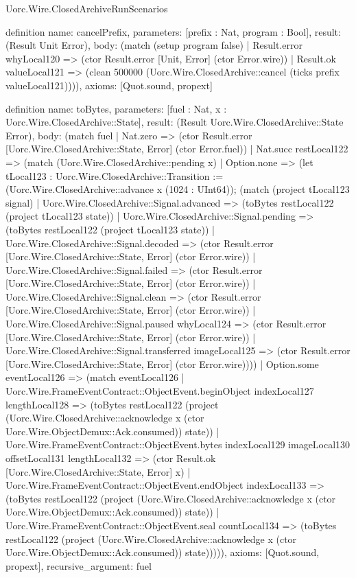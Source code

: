 \begin{lexlean}{Uorc.Wire.ClosedArchiveRunScenarios}
\begin{semanticmodule}
definition{
  name: cancelPrefix,
  parameters: [prefix : Nat, program : Bool],
  result: (Result Unit Error),
  body: (match (setup program false)
    | Result.error whyLocal120 => (ctor Result.error [Unit, Error] (ctor Error.wire))
    | Result.ok valueLocal121 => (clean 500000 (Uorc.Wire.ClosedArchive::cancel (ticks prefix valueLocal121)))),
  axioms: [Quot.sound, propext]
}

definition{
  name: toBytes,
  parameters: [fuel : Nat, x : Uorc.Wire.ClosedArchive::State],
  result: (Result Uorc.Wire.ClosedArchive::State Error),
  body: (match fuel
    | Nat.zero => (ctor Result.error [Uorc.Wire.ClosedArchive::State, Error] (ctor Error.fuel))
    | Nat.succ restLocal122 => (match (Uorc.Wire.ClosedArchive::pending x)
      | Option.none => (let tLocal123 : Uorc.Wire.ClosedArchive::Transition := (Uorc.Wire.ClosedArchive::advance x (1024 : UInt64)); (match (project tLocal123 signal)
        | Uorc.Wire.ClosedArchive::Signal.advanced => (toBytes restLocal122 (project tLocal123 state))
        | Uorc.Wire.ClosedArchive::Signal.pending => (toBytes restLocal122 (project tLocal123 state))
        | Uorc.Wire.ClosedArchive::Signal.decoded => (ctor Result.error [Uorc.Wire.ClosedArchive::State, Error] (ctor Error.wire))
        | Uorc.Wire.ClosedArchive::Signal.failed => (ctor Result.error [Uorc.Wire.ClosedArchive::State, Error] (ctor Error.wire))
        | Uorc.Wire.ClosedArchive::Signal.clean => (ctor Result.error [Uorc.Wire.ClosedArchive::State, Error] (ctor Error.wire))
        | Uorc.Wire.ClosedArchive::Signal.paused whyLocal124 => (ctor Result.error [Uorc.Wire.ClosedArchive::State, Error] (ctor Error.wire))
        | Uorc.Wire.ClosedArchive::Signal.transferred imageLocal125 => (ctor Result.error [Uorc.Wire.ClosedArchive::State, Error] (ctor Error.wire))))
      | Option.some eventLocal126 => (match eventLocal126
        | Uorc.Wire.FrameEventContract::ObjectEvent.beginObject indexLocal127 lengthLocal128 => (toBytes restLocal122 (project (Uorc.Wire.ClosedArchive::acknowledge x (ctor Uorc.Wire.ObjectDemux::Ack.consumed)) state))
        | Uorc.Wire.FrameEventContract::ObjectEvent.bytes indexLocal129 imageLocal130 offsetLocal131 lengthLocal132 => (ctor Result.ok [Uorc.Wire.ClosedArchive::State, Error] x)
        | Uorc.Wire.FrameEventContract::ObjectEvent.endObject indexLocal133 => (toBytes restLocal122 (project (Uorc.Wire.ClosedArchive::acknowledge x (ctor Uorc.Wire.ObjectDemux::Ack.consumed)) state))
        | Uorc.Wire.FrameEventContract::ObjectEvent.seal countLocal134 => (toBytes restLocal122 (project (Uorc.Wire.ClosedArchive::acknowledge x (ctor Uorc.Wire.ObjectDemux::Ack.consumed)) state))))),
  axioms: [Quot.sound, propext],
  recursive_argument: fuel
}


\end{semanticmodule}
\end{lexlean}
